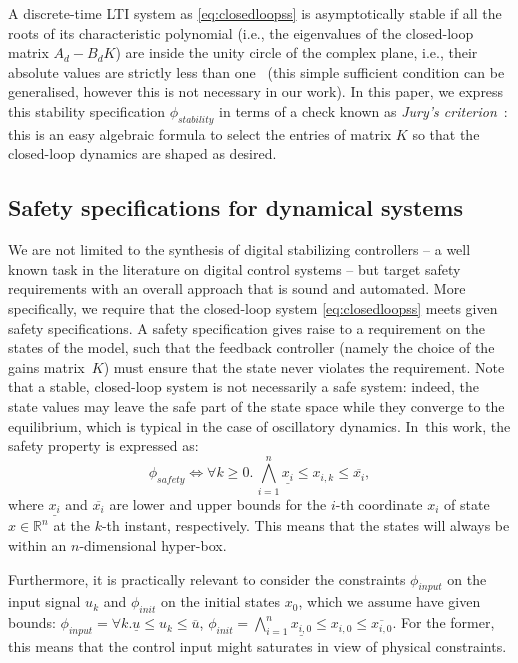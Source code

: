 \documentclass[twocolumn]{autart}    %
\begin{document}
A discrete-time LTI system as \eqref{eq:closedloopss} is asymptotically
stable if all the roots of its characteristic polynomial (i.e., the
eigenvalues of the closed-loop matrix $A_d - B_d K$) are inside the unity
circle of the complex plane, i.e., their absolute values are strictly less than
one~\cite{astrom1997computer} (this simple sufficient condition can be generalised, 
however this is not necessary in our work).  
In this paper, we express this stability specification $\phi_\mathit{stability}$ in terms of a check known as
\emph{Jury's criterion}~\cite{fadali}: this is an easy algebraic formula to
select the entries of matrix $K$ so that the closed-loop dynamics are shaped
as desired.

\subsection{Safety specifications for dynamical systems}
\label{ssec:safety}

We are not limited to the synthesis of digital stabilizing controllers -- a
well known task in the literature on digital control systems -- but target
safety requirements with an overall approach that is sound and automated. 
More specifically, we require that the closed-loop system
\eqref{eq:closedloopss} meets given safety specifications.  A safety
specification gives raise to a requirement on the states of the model, such
that the feedback controller (namely the choice of the gains matrix~$K$)
must ensure that the state never violates the requirement.  Note that a
stable, closed-loop system is not necessarily a safe system: indeed, the
state values may leave the safe part of the state space while they converge
to the equilibrium, which is typical in the case of oscillatory dynamics. 
In~this work, the safety property is expressed as:
%
\begin{equation}
\label{eq:safetyliteral}
\phi_\mathit{safety}\iff \forall k\ge 0.\, \bigwedge_{i=1}^{n}{\underline{x_{i}} \leq x_{i,k} \leq \overline{x_{i}}},
\end{equation}
where $\underline{x_{i}}$ and $\overline{x_{i}}$ are lower and upper bounds
for the $i$-th coordinate $x_{i}$ of state $x\in \mathbb R^n$ at the $k$-th
instant, respectively.  This means that the states will always be within an $n$-dimensional hyper-box.

Furthermore, it is practically relevant to consider the 
constraints $\phi_\mathit{input}$ on the input
signal $u_{k}$ and $\phi_\mathit{init}$ on the initial states $x_0$,
which we assume have given bounds:
$\phi_\mathit{input} = {\forall k.\underline{u} \leq u_{k} \leq \overline{u}} $, 
$\phi_\mathit{init} = \bigwedge_{i=1}^{n} \underline{x_{i,0}} \leq x_{i,0} \leq \overline{x_{i,0}}.$
For the former, this means that the control input might saturates in view of
physical constraints.
\end{document}
